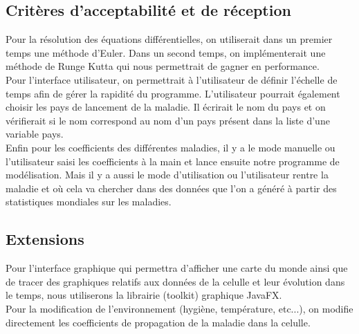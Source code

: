 \documentclass[12pt,a4paper]{report}
\begin{document}
\subsection*{Critères d'acceptabilité et de réception}
\begin{flushleft}
	Pour la résolution des équations différentielles, on utiliserait dans un premier temps une méthode d'Euler. Dans un second temps, on implémenterait une méthode de Runge Kutta qui nous permettrait de gagner en performance. \\
	Pour l'interface utilisateur, on permettrait à l'utilisateur de définir l'échelle de temps afin de gérer la rapidité du programme. L'utilisateur pourrait également choisir les pays de lancement de la maladie. Il écrirait le nom du pays et on vérifierait si le nom correspond au nom d'un pays présent dans la liste d'une variable pays. \\
	Enfin pour les coefficients des différentes maladies, il y a le mode manuelle ou l'utilisateur saisi les coefficients à la main et lance ensuite notre programme de modélisation. Mais il y a aussi le mode d'utilisation ou l'utilisateur rentre la maladie et où cela va chercher dans des données que l'on a généré à partir des statistiques mondiales sur les maladies.
\end{flushleft}

\subsection*{Extensions}
\begin{flushleft}
 	Pour l'interface graphique qui permettra d'afficher une carte du monde ainsi que de tracer des graphiques relatifs aux données de la celulle et leur évolution dans le temps, nous utiliserons la librairie (toolkit) graphique JavaFX. \\
	Pour la modification de l'environnement (hygiène, température, etc...), on modifie directement les coefficients de propagation de la maladie dans la celulle.
\end{flushleft}

\end{document}
